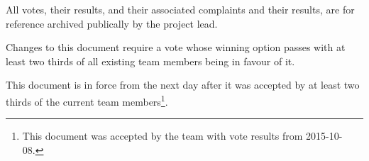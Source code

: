 \documentclass[10pt,a4paper,DIV=calc,headings=medium,twocolumn,final]{scrartcl}
\begin{document}
\begin{contract}

  All votes, their results, and their associated complaints and their
  results, are for reference archived publically by the project lead.


  Changes to this document require a vote whose winning option passes
  with at least two thirds of all existing team members being in
  favour of it.


  This document is in force from the next day after it was accepted by
  at least two thirds of the current team members\footnote{This
    document was accepted by the team with vote results from 2015-10-08.}.
\end{contract}
\end{document}

